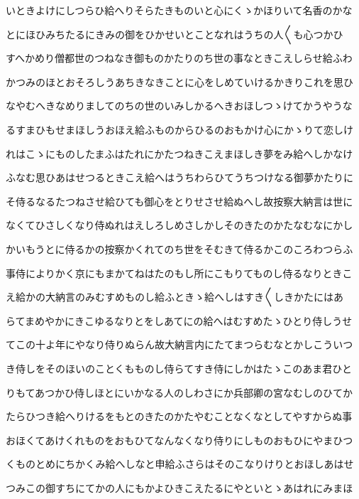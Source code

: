 \documentclass[a4paper,11pt,landscape]{ltjtarticle}
\begin{document}
\par\medskip
いときよけにしつらひ給へりそらたきものいと心にくゝかほりいて名香のかな
\par\medskip
とにほひみちたるにきみの御をひかせいとことなれはうちの人〱も心つかひ
\par\medskip
すへかめり僧都世のつねなき御ものかたりのち世の事なときこえしらせ給ふわ
\par\medskip
かつみのほとおそろしうあちきなきことに心をしめていけるかきりこれを思ひ
\par\medskip
なやむへきなめりましてのちの世のいみしかるへきおほしつゝけてかうやうな
\par\medskip
るすまひもせまほしうおほえ給ふものからひるのおもかけ心にかゝりて恋しけ
\par\medskip
れはこゝにものしたまふはたれにかたつねきこえまほしき夢をみ給へしかなけ
\par\medskip
ふなむ思ひあはせつるときこえ給へはうちわらひてうちつけなる御夢かたりに
\par\medskip
そ侍るなるたつねさせ給ひても御心をとりせさせ給ぬへし故按察大納言は世に
\par\medskip
なくてひさしくなり侍ぬれはえしろしめさしかしそのきたのかたなむなにかし
\par\medskip
かいもうとに侍るかの按察かくれてのち世をそむきて侍るかこのころわつらふ
\par\medskip
事侍によりかく京にもまかてねはたのもし所にこもりてものし侍るなりときこ
\par\medskip
え給かの大納言のみむすめものし給ふときゝ給へしはすき〱しきかたにはあ
\par\medskip
らてまめやかにきこゆるなりとをしあてにの給へはむすめたゝひとり侍しうせ
\par\medskip
てこの十よ年にやなり侍りぬらん故大納言内にたてまつらむなとかしこういつ
\par\medskip
き侍しをそのほいのことくもものし侍らてすき侍にしかはたゝこのあま君ひと
\par\medskip
りもてあつかひ侍しほとにいかなる人のしわさにか兵部卿の宮なむしのひてか
\par\medskip
たらひつき給へりけるをもとのきたのかたやむことなくなとしてやすからぬ事
\par\medskip
おほくてあけくれものをおもひてなんなくなり侍りにしものおもひにやまひつ
\par\medskip
くものとめにちかくみ給へしなと申給ふさらはそのこなりけりとおほしあはせ
\par\medskip
つみこの御すちにてかの人にもかよひきこえたるにやといとゝあはれにみまほ
\end{document}
